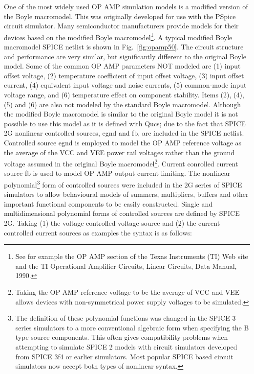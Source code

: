 One of the most widely used OP AMP simulation models is a modified version of the Boyle macromodel.  This was originally developed for use with the PSpice circuit simulator. Many semiconductor manufacturers provide models for their devices based on the modified Boyle macromodel\footnote{See for example the OP AMP section of the Texas Instruments (TI) Web site and the TI Operational Amplifier Circuits, Linear Circuits, Data Manual, 1990.}. A typical modified Boyle macromodel SPICE netlist is shown in Fig.~\ref{fig:opamp50}. The circuit structure and performance are very similar, but significantly different to the original Boyle model. Some of the common OP AMP parameters NOT modeled are (1) input offset voltage, (2) temperature coefficient of input offset voltage, (3) input offset current, (4) equivalent input voltage and noise currents, (5) common-mode input voltage range, and (6) temperature effect on component stability. Items (2), (4), (5) and (6) are also not modeled by the standard Boyle macromodel. Although the modified Boyle macromodel is similar to the original Boyle model it is not possible to use this model as it is defined with Qucs; due to the fact that SPICE 2G nonlinear controlled sources, egnd and fb, are included in the SPICE netlist. Controlled source egnd is employed to model the OP AMP reference voltage as the average of the VCC and VEE power rail voltages rather than the ground voltage assumed in the original Boyle macromodel\footnote{Taking the OP AMP reference voltage to be the average of VCC and VEE allows devices with non-symmetrical power supply voltages to be simulated.}. Current conrolled current source fb is used to model OP AMP output current limiting. The nonlinear polynomial\footnote{The definition of these polynomial functions was changed in the SPICE 3 series simulators to a more conventional algebraic form when specifying the B type source components.  This often gives compatibility problems when attempting to simulate SPICE 2 models with circuit simulators developed from SPICE 3f4 or earlier simulators. Most popular SPICE based circuit simulators now accept both types of nonlinear syntax.} form of controlled sources were included in the 2G series of SPICE simulators to allow behavioural models of summers, multipliers, buffers and other important functional components to be easily constructed. Single and multidimensional polynomial forms of controlled sources are defined by SPICE 2G. Taking (1) the voltage controlled voltage source and (2) the current controlled current sources as examples the syntax is as follows:

